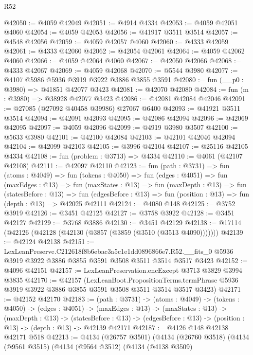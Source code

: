 \begin{lexlean}{R52}
\begin{coremodule}
@42050 := @4059 @42049
@42051 := @4914 @4334
@42053 := @4059 @42051 @4060
@42054 := @4059 @42053
@42056 := @41917 @3511 @3514
@42057 := @4548 @42056
@42059 := @4059 @42057 @4060
@42060 := @4333 @42059
@42061 := @4333 @42060
@42062 := @42054 @42061
@42064 := @4059 @42062 @4060
@42066 := @4059 @42064 @4060
@42067 := @42050 @42066
@42068 := @4333 @42067
@42069 := @4059 @42068
@42070 := @5544 @3980
@42077 := @4107 @5986 @5936 @3919 @3922 @3886 @3855 @3591
@42080 := fun (__p0 : @3980) => @41851 @42077 @3423
@42081 := @42070 @42080
@42084 := fun (m : @3980) => @38928 @42077 @3423
@42086 := @42081 @42084 @42046
@42091 := @27085 (@27092 @40458 @39986) @27067 @6400
@42093 := @41921 @3511 @3514
@42094 := @42091 @42093
@42095 := @42086 @42094
@42096 := @42069 @42095
@42097 := @4059 @42096
@42099 := @4919 @3980 @3507
@42100 := @5633 @3980
@42101 := @42100 @42084
@42103 := @42101 @42046 @42094
@42104 := @42099 @42103
@42105 := @3996 @42104
@42107 := @25116 @42105 @4334
@42108 := fun (problem : @3713) => @4334
@42110 := @4061 (@42107 @42108)
@42111 := @42097 @42110
@42123 := fun (path : @3731) =>
  fun (atoms : @4049) =>
  fun (tokens : @4050) =>
  fun (edges : @4051) =>
  fun (maxEdges : @13) =>
  fun (maxStates : @13) =>
  fun (maxDepth : @13) =>
  fun (statesBefore : @13) =>
  fun (edgesBefore : @13) => fun (position : @13) => fun (depth : @13) => @42025 @42111
@42124 := @4080 @148
@42125 := @3752 @3919
@42126 := @3451 @42125
@42127 := @3758 @3922
@42128 := @3451 @42127
@42129 := @3768 @3886
@42130 := @3451 @42129
@42138 := @17114 (@42126 (@42128 (@42130 (@3857 (@3859 (@3510 (@3513 @4090)))))))
@42139 := @42124 @42138
@42151 := LexLeanPreserve.C212618f8b6ebac3a5c1e1dd0896866e7.R52.__fits_0
    @5936
    @3919
    @3922
    @3886
    @3855
    @3591
    @3508
    @3511
    @3514
    @3517
    @3423
@42152 := @4096 @42151
@42157 := LexLeanPreservation.encExcept @3713 @3829 @3994 @3835
@42170 := @42157
    (LexLeanBoot.PropositionTerms.termPhrase
      @5936
      @3919
      @3922
      @3886
      @3855
      @3591
      @3508
      @3511
      @3514
      @3517
      @3423)
@42171 := @42152 @42170
@42183 := (path : @3731) ->
  (atoms : @4049) ->
  (tokens : @4050) ->
  (edges : @4051) ->
  (maxEdges : @13) ->
  (maxStates : @13) ->
  (maxDepth : @13) ->
  (statesBefore : @13) -> (edgesBefore : @13) -> (position : @13) -> (depth : @13) -> @42139 @42171
@42187 := @4126 @148 @42138 @42171 @518
@42213 := @4134
    (@26757 @3501)
    (@4134
      (@26760 @3518)
      (@4134
        (@9561 @3515)
        (@4134
          (@9564 @3512)
          (@4134
            (@4138 @3509)

\end{coremodule}
\end{lexlean}
